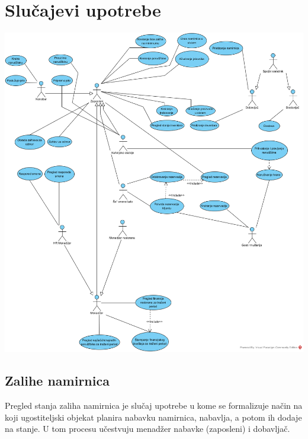 \documentclass{article}
\begin{document}
\section{Slučajevi upotrebe}
\includegraphics[width=\textwidth]{SU_0_grupni.png}

\subsection{Zalihe namirnica}
Pregled stanja zaliha namirnica je slučaj upotrebe u kome se formalizuje način na koji ugostiteljski objekat planira nabavku namirnica, nabavlja, a potom ih dodaje na stanje. U tom procesu učestvuju menadžer nabavke (zaposleni) i dobavljač. 
\end{document}
